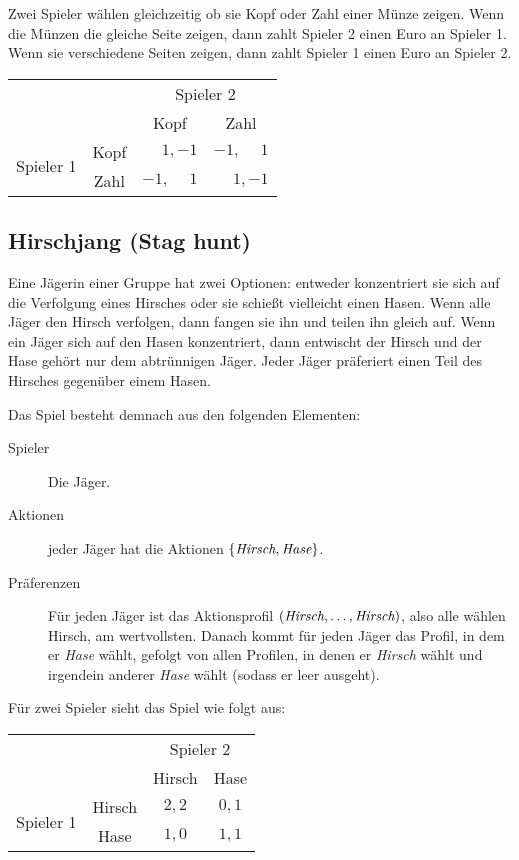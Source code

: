 Zwei Spieler wählen gleichzeitig ob sie Kopf oder Zahl einer Münze zeigen.
Wenn die Münzen die gleiche Seite zeigen, dann zahlt Spieler 2 einen Euro an Spieler 1.
Wenn sie verschiedene Seiten zeigen, dann zahlt Spieler 1 einen Euro an Spieler 2.

\begin{center}
  \begin{tabular}{cccc}
    & & \multicolumn{2}{c}{Spieler 2}\\
    & & Kopf & Zahl\\
    \multirow{2}{*}{Spieler 1} &
      Kopf & $\phantom{-}1, -1$ & $-1, \phantom{-}1$\\
    & Zahl & $-1, \phantom{-}1$ & $\phantom{-}1, -1$\\
  \end{tabular}
\end{center}

\subsection{Hirschjang (Stag hunt)}%
\label{sub:hirschjang_stag_hunt}

Eine Jägerin einer Gruppe hat zwei Optionen: entweder konzentriert sie sich auf die
Verfolgung eines Hirsches oder sie schießt vielleicht einen Hasen.
Wenn alle Jäger den Hirsch verfolgen, dann fangen sie ihn und teilen ihn gleich auf.
Wenn ein Jäger sich auf den Hasen konzentriert, dann entwischt der Hirsch und der Hase
gehört nur dem abtrünnigen Jäger.
Jeder Jäger präferiert einen Teil des Hirsches gegenüber einem Hasen.

Das Spiel besteht demnach aus den folgenden Elementen:
\begin{description}
  \item[Spieler] Die Jäger.
  \item[Aktionen] jeder Jäger hat die Aktionen $\{\emph{Hirsch}, \emph{Hase}\}$.
  \item[Präferenzen] Für jeden Jäger ist das Aktionsprofil $(\emph{Hirsch}, \ldots,
    \emph{Hirsch})$, also alle wählen Hirsch, am wertvollsten.
    Danach kommt für jeden Jäger das Profil, in dem er \emph{Hase} wählt, gefolgt von
    allen Profilen, in denen er \emph{Hirsch} wählt und irgendein anderer \emph{Hase}
    wählt (sodass er leer ausgeht).
\end{description}
Für zwei Spieler sieht das Spiel wie folgt aus:
\begin{center}
  \begin{tabular}{cccc}
    & & \multicolumn{2}{c}{Spieler 2}\\
    & & Hirsch & Hase\\
    \multirow{2}{*}{Spieler 1} &
      Hirsch & $2, 2$ & $0,1$\\
    & Hase   & $1, 0$ & $1,1$\\
  \end{tabular}
\end{center}


